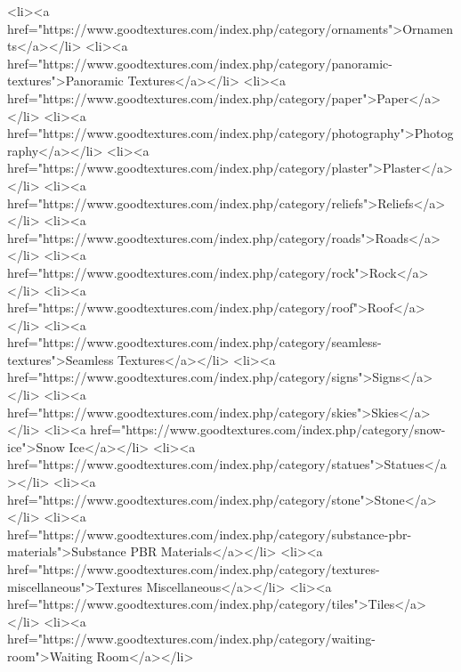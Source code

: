                                                     <li><a href="https://www.goodtextures.com/index.php/category/ornaments">Ornaments</a></li>
                                                    <li><a href="https://www.goodtextures.com/index.php/category/panoramic-textures">Panoramic Textures</a></li>
                                                    <li><a href="https://www.goodtextures.com/index.php/category/paper">Paper</a></li>
                                                    <li><a href="https://www.goodtextures.com/index.php/category/photography">Photography</a></li>
                                                    <li><a href="https://www.goodtextures.com/index.php/category/plaster">Plaster</a></li>
                                                    <li><a href="https://www.goodtextures.com/index.php/category/reliefs">Reliefs</a></li>
                                                    <li><a href="https://www.goodtextures.com/index.php/category/roads">Roads</a></li>
                                                    <li><a href="https://www.goodtextures.com/index.php/category/rock">Rock</a></li>
                                                    <li><a href="https://www.goodtextures.com/index.php/category/roof">Roof</a></li>
                                                    <li><a href="https://www.goodtextures.com/index.php/category/seamless-textures">Seamless Textures</a></li>
                                                    <li><a href="https://www.goodtextures.com/index.php/category/signs">Signs</a></li>
                                                    <li><a href="https://www.goodtextures.com/index.php/category/skies">Skies</a></li>
                                                    <li><a href="https://www.goodtextures.com/index.php/category/snow-ice">Snow Ice</a></li>
                                                    <li><a href="https://www.goodtextures.com/index.php/category/statues">Statues</a></li>
                                                    <li><a href="https://www.goodtextures.com/index.php/category/stone">Stone</a></li>
                                                    <li><a href="https://www.goodtextures.com/index.php/category/substance-pbr-materials">Substance PBR Materials</a></li>
                                                    <li><a href="https://www.goodtextures.com/index.php/category/textures-miscellaneous">Textures Miscellaneous</a></li>
                                                    <li><a href="https://www.goodtextures.com/index.php/category/tiles">Tiles</a></li>
                                                    <li><a href="https://www.goodtextures.com/index.php/category/waiting-room">Waiting Room</a></li>
